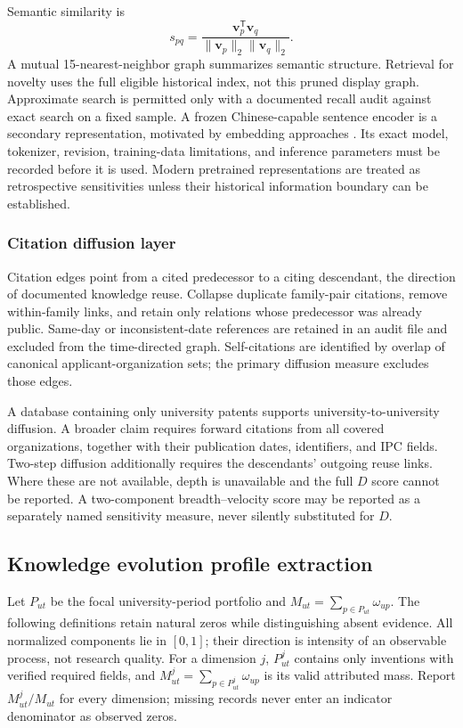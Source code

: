 Semantic similarity is
\begin{equation}
 s_{pq}=\frac{\mathbf{v}_p^{\mathsf T}\mathbf{v}_q}
 {\|\mathbf{v}_p\|_2\|\mathbf{v}_q\|_2}.
 \label{eq:semantic}
\end{equation}
A mutual 15-nearest-neighbor graph summarizes semantic structure. Retrieval for
novelty uses the full eligible historical index, not this pruned display graph.
Approximate search is permitted only with a documented recall audit against
exact search on a fixed sample. A frozen Chinese-capable sentence encoder is a
secondary representation, motivated by embedding approaches
\citep{reimers2019,sarica2020}. Its exact model, tokenizer, revision, training-data
limitations, and inference parameters must be recorded before it is used.
Modern pretrained representations are treated as retrospective sensitivities
unless their historical information boundary can be established.

\subsubsection{Citation diffusion layer}
Citation edges point from a cited predecessor to a citing descendant, the direction
of documented knowledge reuse. Collapse duplicate family-pair citations, remove
within-family links, and retain only relations whose predecessor was already
public. Same-day or inconsistent-date references are retained in an audit file
and excluded from the time-directed graph. Self-citations are identified by
overlap of canonical applicant-organization sets; the primary diffusion measure
excludes those edges.

A database containing only university patents supports university-to-university
diffusion. A broader claim requires forward citations from all covered
organizations, together with their publication dates, identifiers, and IPC fields.
Two-step diffusion additionally requires the descendants' outgoing reuse links.
Where these are not available, depth is unavailable and the full $D$ score cannot
be reported. A two-component breadth--velocity score may be reported as a
separately named sensitivity measure, never silently substituted for $D$.

\subsection{Knowledge evolution profile extraction}\label{sec:indicators}
Let $P_{ut}$ be the focal university-period portfolio and
$M_{ut}=\sum_{p\in P_{ut}}\omega_{up}$. The following definitions retain natural
zeros while distinguishing absent evidence. All normalized components lie in
$[0,1]$; their direction is intensity of an observable process, not research quality.
For a dimension $j$, $P_{ut}^{j}$ contains only inventions with verified required
fields, and $M_{ut}^{j}=\sum_{p\in P_{ut}^{j}}\omega_{up}$ is its valid attributed
mass. Report $M_{ut}^{j}/M_{ut}$ for every dimension; missing records never enter
an indicator denominator as observed zeros.

